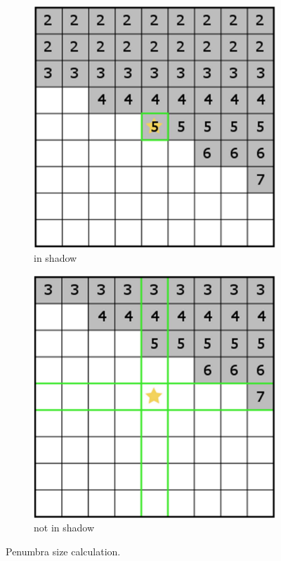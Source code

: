 \begin{figure}\label{f:distance-selection}
\begin{center}
	\begin{subfigure}[b]{0.45\textwidth}
		\includegraphics[width=1.0\textwidth]{graphics/shadows/penumbra-size-calculation-1}	
		\caption{in shadow}
	\end{subfigure}
	\begin{subfigure}[b]{0.45\textwidth}
		\includegraphics[width=1.0\textwidth]{graphics/shadows/penumbra-size-calculation-2}	
		\caption{not in shadow}
	\end{subfigure}
\end{center}
\caption{Penumbra size calculation.}
\end{figure}




